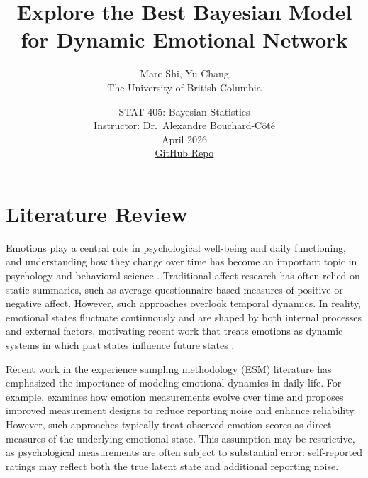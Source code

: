 \documentclass[12pt,letterpaper,fleqn]{article}
\title{\large\bfseries
Explore the Best Bayesian Model for Dynamic Emotional Network
}
\author{
\small
Marc Shi,  Yu Chang \\
 \small
The University of British Columbia
}
\date{\small
STAT 405: Bayesian Statistics \\
Instructor: Dr.~Alexandre Bouchard-Côté \\
April 2026 \\
\href{https://github.com/Marclianjie/STAT405-Project-}{GitHub Repo}
}
\begin{document}
\maketitle

\section{Literature Review}

Emotions play a central role in psychological well-being and daily functioning, and understanding how they change over time has become an important topic in psychology and behavioral science \cite{kuppens2017, houben2016, pirla2023}. Traditional affect research has often relied on static summaries, such as average questionnaire-based measures of positive or negative affect. However, such approaches overlook temporal dynamics. In reality, emotional states fluctuate continuously and are shaped by both internal processes and external factors, motivating recent work that treats emotions as dynamic systems in which past states influence future states \cite{kuppens2017, haslbeck2022}.


Recent work in the experience sampling methodology (ESM) literature has emphasized the importance of modeling emotional dynamics in daily life. For example, \cite{Kullar2024} examines how emotion measurements evolve over time and proposes improved measurement designs to reduce reporting noise and enhance reliability. However, such approaches typically treat observed emotion scores as direct measures of the underlying emotional state. This assumption may be restrictive, as psychological measurements are often subject to substantial error: self-reported ratings may reflect both the true latent state and additional reporting noise.
\end{document}
